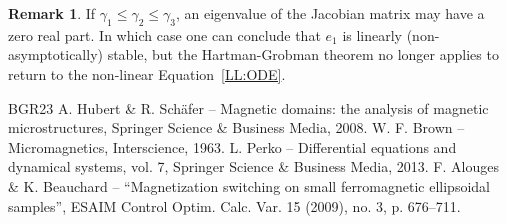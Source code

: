 \documentclass[10pt]{amsart}
\theoremstyle{definition}
\newtheorem{remark}[theorem]{Remark}
\begin{document}
\begin{remark}
If $\gamma_1\leq\gamma_2\leq\gamma_3$, an eigenvalue of the Jacobian matrix may have a zero real part. In which case one can conclude that $e_1$ is linearly (non-asymptotically) stable, but {the Hartman-Grobman theorem} no longer applies to return to the non-linear Equation~\eqref{LL:ODE}.
\end{remark}
\begin{thebibliography}{BGR23}
 A. Hubert \& R. Schäfer – Magnetic domains: the analysis of magnetic microstructures, Springer Science \& Business Media, 2008.
 W. F. Brown – Micromagnetics, Interscience, 1963.
 L. Perko – Differential equations and dynamical systems, vol. 7, Springer Science \& Business Media, 2013.
 F. Alouges \& K. Beauchard – “Magnetization switching on small ferromagnetic ellipsoidal samples”, ESAIM Control Optim. Calc. Var. 15 (2009), no. 3, p. 676–711.
\end{thebibliography}
\end{document}

